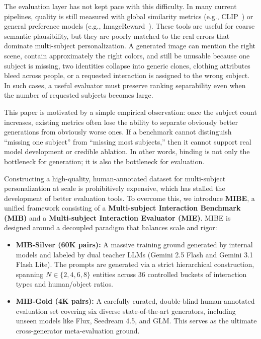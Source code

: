 \documentclass{article}
\begin{document}
The evaluation layer has not kept pace with this difficulty. In many current pipelines, quality is still measured with global similarity metrics (e.g., CLIP~\cite{radford2021learning}) or general preference models (e.g., ImageReward~\cite{xu2023imagereward}). These tools are useful for coarse semantic plausibility, but they are poorly matched to the real errors that dominate multi-subject personalization. A generated image can mention the right scene, contain approximately the right colors, and still be unusable because one subject is missing, two identities collapse into generic clones, clothing attributes bleed across people, or a requested interaction is assigned to the wrong subject. In such cases, a useful evaluator must preserve ranking separability even when the number of requested subjects becomes large.

This paper is motivated by a simple empirical observation: once the subject count increases, existing metrics often lose the ability to separate obviously better generations from obviously worse ones. If a benchmark cannot distinguish ``missing one subject'' from ``missing most subjects,'' then it cannot support real model development or credible ablation. In other words, binding is not only the bottleneck for generation; it is also the bottleneck for evaluation.

Constructing a high-quality, human-annotated dataset for multi-subject personalization at scale is prohibitively expensive, which has stalled the development of better evaluation tools. To overcome this, we introduce \textbf{MIBE}, a unified framework consisting of a \textbf{Multi-subject Interaction Benchmark (MIB)} and a \textbf{Multi-subject Interaction Evaluator (MIE)}. MIBE is designed around a decoupled paradigm that balances scale and rigor:

\begin{itemize}
    \item \textbf{MIB-Silver (60K pairs):} A massive training ground generated by internal models and labeled by dual teacher LLMs (Gemini 2.5 Flash and Gemini 3.1 Flash Lite). The prompts are generated via a strict hierarchical construction, spanning $N \in \{2,4,6,8\}$ entities across 36 controlled buckets of interaction types and human/object ratios.
    \item \textbf{MIB-Gold (4K pairs):} A carefully curated, double-blind human-annotated evaluation set covering six diverse state-of-the-art generators, including unseen models like Flux, Seedream 4.5, and GLM. This serves as the ultimate cross-generator meta-evaluation ground.
\end{itemize}
\end{document}
